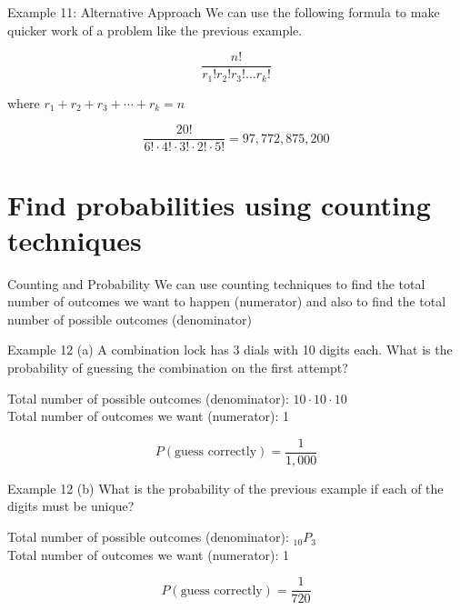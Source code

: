 \documentclass[t]{beamer}
\begin{document}
\begin{frame}{Example 11: Alternative Approach}
We can use the following formula to make quicker work of a problem like the previous example.	\newline\\	\pause

\[ \frac{n!}{r_1!r_2!r_3!\dots r_k!} \]	\bigskip

where $r_1 + r_2 + r_3 + \cdots + r_k = n$	\newline\\	\pause

\[\frac{20!}{6! \cdot 4! \cdot 3! \cdot 2! \cdot 5!} = 97,772,875,200\]
\end{frame}

\section{Find probabilities using counting techniques}

\begin{frame}{Counting and Probability}
We can use counting techniques to find the total number of outcomes we want to happen (numerator) and also to find the total number of possible outcomes (denominator)
\end{frame}

\begin{frame}{Example 12}
(a) \quad A combination lock has 3 dials with 10 digits each. What is the probability of guessing the combination on the first attempt?	\newline\\	\pause

Total number of possible outcomes (denominator): $10 \cdot 10 \cdot 10$	\newline\\	\pause
Total number of outcomes we want (numerator): 1	\newline\\	\pause

\[P(\text{guess correctly}) = \frac{1}{1,000}\]
\end{frame}

\begin{frame}{Example 12}
(b) \quad What is the probability of the previous example if each of the digits must be unique?	\newline\\	\pause

Total number of possible outcomes (denominator): $_{10}P_3$	\newline\\	\pause
Total number of outcomes we want (numerator): 1	\newline\\	\pause

\[P(\text{guess correctly}) = \frac{1}{720}\]
\end{frame}
\end{document}
